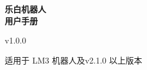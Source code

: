 \begin{titlepage}
    \centering

    {\sffamily\bfseries 乐白机器人\\[1em]用户手册}

    \vspace{2em}

    {\sf v1.0.0}

    \vfill

    {适用于 LM3 机器人及\LM v2.1.0 以上版本}
\end{titlepage}